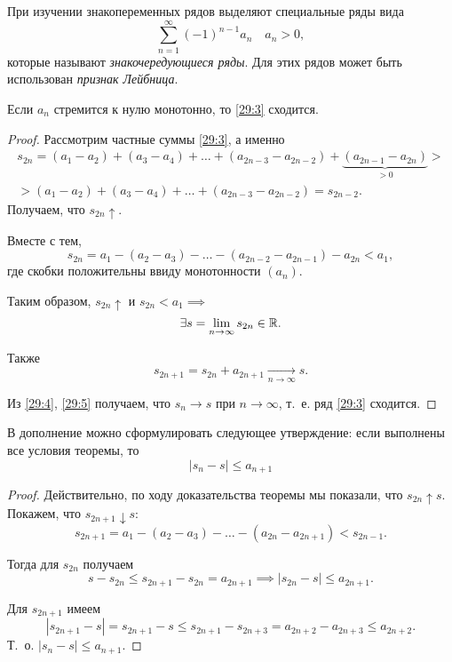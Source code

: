 \documentclass[../../main.tex]{subfiles}
\begin{document}
	При изучении знакопеременных рядов выделяют специальные ряды вида
	\begin{equation}
		\sum_{n = 1}^\infty (-1)^{n - 1}a_n\quad a_n > 0,
		\label{29:3}
	\end{equation}
	которые называют \emph{знакочередующиеся ряды}. 
	Для этих рядов может быть использован \emph{признак Лейбница}.
	\begin{thm}
		\label{29:leibnitz}
		Если $a_n$ стремится к нулю монотонно, то \eqref{29:3} сходится.
	\end{thm}
	\begin{proof}
		Рассмотрим частные суммы \eqref{29:3}, а именно
		\begin{gather*}
			s_{2n} = (a_1 - a_2) + (a_3 - a_4) + \ldots + (a_{2n - 3} - a_{2n - 2}) + 
			\underbrace{(a_{2n - 1} - a_{2n})}_{> 0} >\\
			> (a_1 - a_2) + (a_3 - a_4) + \ldots + (a_{2n - 3} - a_{2n - 2}) = s_{2n - 2}.
		\end{gather*}
		Получаем, что $s_{2n}\uparrow$.
		
		Вместе с тем,
		\[s_{2n} = a_1 - (a_{2} - a_3) - \ldots - (a_{2n - 2} - a_{2n - 1}) - a_{2n} < a_1,\]
		где скобки положительны ввиду монотонности $(a_n)$.
		
		Таким образом, $s_{2n}\uparrow$ и $s_{2n} < a_1\implies $
		\begin{equation}
			\exists s = \lim\limits_{n\to\infty}s_{2n}\in\mathbb{R}.
			\label{29:4}
		\end{equation}
		
		Также 
		\begin{equation}
			s_{2n + 1} = s_{2n} + a_{2n + 1}
			\underset{n\to\infty}{\longrightarrow}s.
			\label{29:5}
		\end{equation}
		
		Из \eqref{29:4}, \eqref{29:5} получаем, что $s_n\to s$ при $n\to\infty$, т.~е. ряд 
		\eqref{29:3} сходится.
	\end{proof}

	В дополнение можно сформулировать следующее утверждение: если выполнены все условия 
	теоремы, то
	\begin{equation}
		\left|s_n - s\right|\leq a_{n + 1}
		\label{29:6}
	\end{equation}
	\begin{proof}
		Действительно, по ходу доказательства теоремы мы показали, что $s_{2n}\uparrow s$. 
		Покажем, что $s_{2n + 1}\downarrow s$:
		\[s_{2n + 1} = a_1 - (a_2 - a_3) - \ldots - (a_{2n} - a_{2n + 1}) < s_{2n - 1}.\]
		
		Тогда для $s_{2n}$ получаем
		\[s - s_{2n} \leq s_{2n + 1} - s_{2n} = a_{2n + 1}
		\implies |s_{2n} - s|\leq a_{2n + 1}.\]
		
		Для $s_{2n + 1}$ имеем
		\[|s_{2n + 1} - s| = s_{2n + 1} - s 
		\leq s_{2n + 1} - s_{2n + 3} = 
		a_{2n + 2} - a_{2n + 3}\leq a_{2n + 2}.\]
		Т.~о. $|s_n - s|\leq a_{n + 1}$.
	\end{proof}
\end{document}
